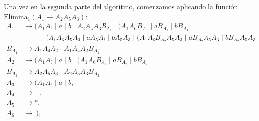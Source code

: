 \documentclass[12pt]{article}
\begin{document}
\begin{ejercicio}[2.5 puntos]
\begin{description}
        Una vez en la segunda parte del algoritmo, comenzamos aplicando la función $\text{Elimina}_1(A_1\rightarrow A_2 A_5 A_3)$:
        \begin{align*}
            A_1 &\to (A_1 A_6 \mid a \mid b\mid A_2 A_5 A_3 B_{A_1} \mid (A_1 A_6 B_{A_1} \mid a B_{A_1} \mid b B_{A_1} \mid \\ & \hspace{1cm} \mid (A_1 A_6A_5A_3 \mid aA_5A_3 \mid bA_5A_3 \mid (A_1 A_6 B_{A_2}A_5A_3 \mid  a B_{A_2}A_5A_3 \mid  b B_{A_2}A_5A_3 \\
            B_{A_1} &\to A_1 A_4 A_2 \mid A_1 A_4 A_2 B_{A_1} \\
            A_2 &\to (A_1 A_6 \mid a \mid b \mid (A_1 A_6 B_{A_2} \mid  a B_{A_2} \mid  b B_{A_2} \\
            B_{A_2} & \to A_2 A_5 A_3 \mid A_2 A_5 A_3 B_{A_2}\\
            A_3 &\to (A_1 A_6 \mid a \mid b,\\
            A_4 &\to +,\\
            A_5 &\to *,\\
            A_6 &\to~),
        \end{align*}


\end{description}
\end{ejercicio}
\end{document}
